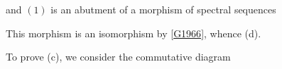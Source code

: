     and \((1)\) is an abutment of a morphism of spectral sequences
    

    This morphism is an isomorphism by [\hyperref[G1966]{G1966}], whence (d).\par{}To prove (c), we consider the commutative diagram
    
